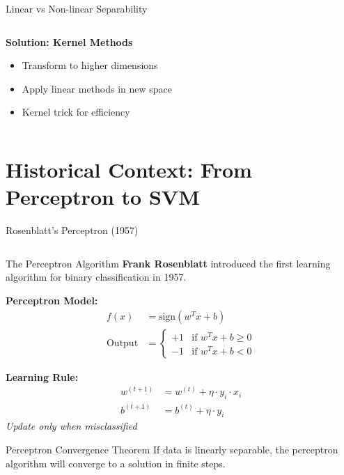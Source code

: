 \documentclass[8pt,aspectratio=1610]{beamer}
\begin{document}
\begin{frame}{Linear vs Non-linear Separability}
\begin{columns}[t]
\begin{column}{0.48\textwidth}
\textbf{Solution: Kernel Methods}
\begin{itemize}
\setlength{\itemsep}{1pt}
\item Transform to higher dimensions
\item Apply linear methods in new space
\item Kernel trick for efficiency
\end{itemize}
\end{column}
\end{columns}
\end{frame}

\section{Historical Context: From Perceptron to SVM}

\begin{frame}{Rosenblatt's Perceptron (1957)}
\begin{columns}[t]
\begin{column}{0.48\textwidth}
\begin{block}{The Perceptron Algorithm}
\textbf{Frank Rosenblatt} introduced the first learning algorithm for binary classification in 1957.
\end{block}

\vspace{0.3cm}
\textbf{Perceptron Model:}
\begin{align}
f(x) &= \text{sign}(w^T x + b) \\
\text{Output} &= \begin{cases}
+1 & \text{if } w^T x + b \geq 0 \\
-1 & \text{if } w^T x + b < 0
\end{cases}
\end{align}

\vspace{0.3cm}
\textbf{Learning Rule:}
\begin{align}
w^{(t+1)} &= w^{(t)} + \eta \cdot y_i \cdot x_i \\
b^{(t+1)} &= b^{(t)} + \eta \cdot y_i
\end{align}
\textit{Update only when misclassified}

\vspace{0.3cm}
\begin{alertblock}{Perceptron Convergence Theorem}
If data is linearly separable, the perceptron algorithm will converge to a solution in finite steps.
\end{alertblock}
\end{column}


\end{columns}
\end{frame}
\end{document}
